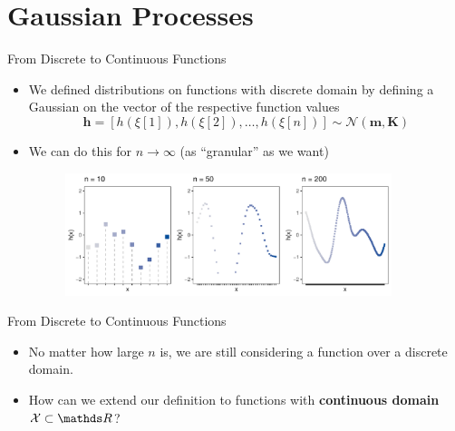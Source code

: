 \documentclass[11pt,compress,t,notes=noshow, xcolor=table]{beamer}
\begin{document}







\section{Gaussian Processes}

\begin{vbframe}{From Discrete to Continuous Functions}

\begin{itemize}
  \item We defined distributions on functions with discrete domain by defining a Gaussian on the vector of the respective function values 
  $$
    \mathbf{h} = [h(\xi[1]), h(\xi[2]), \dots, h(\xi[n])] \sim \mathcal{N}(\bm{m}, \bm{K})
  $$

  \item We can do this for $n \to \infty$ (as \enquote{granular} as we want)
  \begin{figure}
    \includegraphics[width = 0.9\textwidth]{figure/discrete/example_limit.pdf}
  \end{figure}
\end{itemize}

\end{vbframe}

\begin{frame}{From Discrete to Continuous Functions}


\begin{itemize}
  \item No matter how large $n$ is, we are still considering a function over a discrete domain. 
  \item How can we extend our definition to functions with \textbf{continuous domain} $\Xspace \subset \R$?
\end{itemize}

\end{frame}
\end{document}
